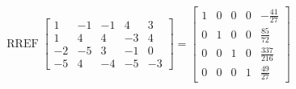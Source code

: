 \begin{exerciseAnswer} 


\[\operatorname{RREF} \left[\begin{array}{ccccc}
1 & -1 & -1 & 4 & 3 \\
1 & 4 & 4 & -3 & 4 \\
-2 & -5 & 3 & -1 & 0 \\
-5 & 4 & -4 & -5 & -3
\end{array}\right] = \left[\begin{array}{ccccc}
1 & 0 & 0 & 0 & -\frac{41}{27} \\
0 & 1 & 0 & 0 & \frac{85}{72} \\
0 & 0 & 1 & 0 & \frac{337}{216} \\
0 & 0 & 0 & 1 & \frac{49}{27}
\end{array}\right] \]



\end{exerciseAnswer}
